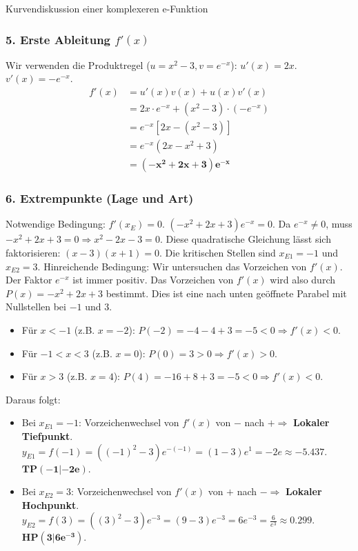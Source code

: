 \begin{loesungsumgebung}{Kurvendiskussion einer komplexeren e-Funktion}
\subsubsection*{5. Erste Ableitung $f'(x)$}
Wir verwenden die Produktregel ($u=x^2-3, v=e^{-x}$):
$u'(x) = 2x$.
$v'(x) = -e^{-x}$.
\begin{align*}
f'(x) &= u'(x)v(x) + u(x)v'(x) \\
      &= 2x \cdot e^{-x} + (x^2-3) \cdot (-e^{-x}) \\
      &= e^{-x} [2x - (x^2-3)] \\
      &= e^{-x} (2x - x^2 + 3) \\
      &= \mathbf{(-x^2 + 2x + 3)e^{-x}}
\end{align*}

\subsubsection*{6. Extrempunkte (Lage und Art)}
Notwendige Bedingung: $f'(x_E)=0$.
$(-x^2 + 2x + 3)e^{-x} = 0$.
Da $e^{-x} \neq 0$, muss $-x^2 + 2x + 3 = 0 \Rightarrow x^2 - 2x - 3 = 0$.
Diese quadratische Gleichung lässt sich faktorisieren: $(x-3)(x+1)=0$.
Die kritischen Stellen sind $x_{E1} = -1$ und $x_{E2} = 3$.
Hinreichende Bedingung: Wir untersuchen das Vorzeichen von $f'(x)$. Der Faktor $e^{-x}$ ist immer positiv. Das Vorzeichen von $f'(x)$ wird also durch $P(x) = -x^2+2x+3$ bestimmt. Dies ist eine nach unten geöffnete Parabel mit Nullstellen bei $-1$ und $3$.
\begin{itemize}
    \item Für $x < -1$ (z.B. $x=-2$): $P(-2) = -4-4+3 = -5 < 0 \Rightarrow f'(x) < 0$.
    \item Für $-1 < x < 3$ (z.B. $x=0$): $P(0) = 3 > 0 \Rightarrow f'(x) > 0$.
    \item Für $x > 3$ (z.B. $x=4$): $P(4) = -16+8+3 = -5 < 0 \Rightarrow f'(x) < 0$.
\end{itemize}
Daraus folgt:
\begin{itemize}
    \item Bei $x_{E1} = -1$: Vorzeichenwechsel von $f'(x)$ von $-$ nach $+ \Rightarrow$ \textbf{Lokaler Tiefpunkt}.
    $y_{E1} = f(-1) = ((-1)^2-3)e^{-(-1)} = (1-3)e^1 = -2e \approx -5.437$.
    $\mathbf{TP(-1|-2e)}$.
    \item Bei $x_{E2} = 3$: Vorzeichenwechsel von $f'(x)$ von $+$ nach $- \Rightarrow$ \textbf{Lokaler Hochpunkt}.
    $y_{E2} = f(3) = ((3)^2-3)e^{-3} = (9-3)e^{-3} = 6e^{-3} = \frac{6}{e^3} \approx 0.299$.
    $\mathbf{HP(3|6e^{-3})}$.
\end{itemize}


\end{loesungsumgebung}
